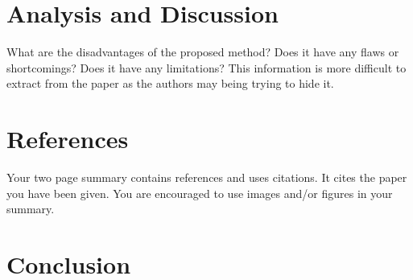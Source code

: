 \documentclass[a4paper,10pt]{article}
\begin{document}
\section{Analysis and Discussion}
What are the disadvantages of the proposed method? Does it have any flaws or shortcomings? Does it have any limitations? This information is more difficult to extract from the paper as the authors may being trying to hide it.


\section{References}
Your two page summary contains references and uses citations. It cites the paper you have been given.
You are encouraged to use images and/or figures in your summary.


\section{Conclusion}



\medskip
\newpage


\end{document}
